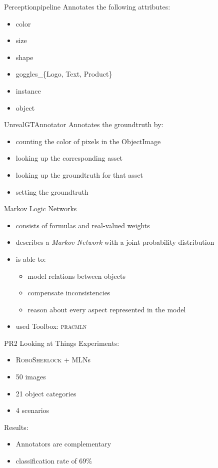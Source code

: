 \documentclass[]{beamer}
\begin{document}
\begin{frame}{Perceptionpipeline}
Annotates the following attributes:
	\begin{itemize}
		\item color
		\item size
		\item shape
		\item goggles\_\{Logo, Text, Product\}
		\item instance
		\item object
	\end{itemize}
\end{frame}

\begin{frame}{UnrealGTAnnotator}
Annotates the groundtruth by:
	\begin{itemize}
		\item counting the color of pixels in the ObjectImage
		\item looking up the corresponding asset 
		\item looking up the groundtruth for that asset
		\item setting the groundtruth 
	\end{itemize}

\end{frame}


\begin{frame}{Markov Logic Networks}
	\begin{itemize}
		\item consists of formulas and real-valued weights
		\item describes a \textit{Markov Network} with a joint probability distribution
		\item is able to:
		\begin{itemize}
			\item model relations between objects
			\item compensate inconsistencies
			\item reason about every aspect represented in the model
		\end{itemize}
		\item used Toolbox: \textsc{pracmln}
	\end{itemize}
\end{frame}

\begin{frame}{PR2 Looking at Things}
Experiments:
	\begin{itemize}
		\item \textsc{RoboSherlock} + MLNs
		\item 50 images 
		\item 21 object categories
		\item 4 scenarios
	\end{itemize}
\bigskip
Results:
	\begin{itemize}
		\item Annotators are complementary
		\item classification rate of 69\%
	\end{itemize}
\end{frame}
\end{document}
